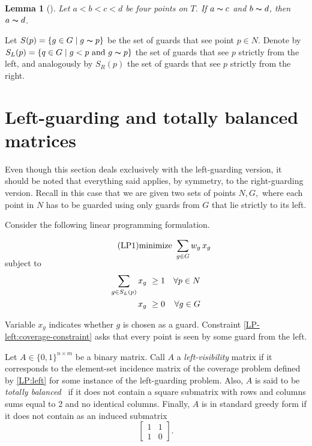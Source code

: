 \documentclass[11pt]{article}
\newcommand{\sees}{\thicksim}
\newtheorem{lemma}{Lemma}
\begin{document}
\begin{lemma}[\cite{journals/siamcomp/Ben-MosheKM07}] \label{lem:Mitchell}
  Let $a<b<c<d$ be four points on $T$. If $a\sees c$ and $b\sees d$,
  then $a\sees d$.
\end{lemma}

Let $S(p)=\{g\in G \mid g \sees p \}$ be the set of guards that
see point $p\in N$.  Denote by $S_L(p)=\{q\in G \mid g < p \textrm{
and } g\sees p \}$ the set of guards that see $p$ strictly from
the left, and analogously by $S_R(p)$ the set of guards that see $p$
strictly from the right.

\section{Left-guarding and totally balanced matrices}
\label{sec:left-guarding}

Even though this section deals exclusively with the left-guarding version, it
should be noted that everything said applies, by symmetry, to the
right-guarding version. Recall in this case that we are given two sets of points $N,G,$ where each point in $N$
has to be guarded using only guards from $G$ that lie strictly to its left.

Consider the following linear programming formulation.

\begin{gather} \label{LP:left} \tag{LP1}
  \text{minimize} \ \sum_{g\in G} w_g\, x_g \\[-6ex] \notag
\end{gather}
\hspace{1.5cm} subject to \\[-3ex]
\begin{align}
  \label{LP-left:coverage-constraint}
  \sum_{g\in S_L(p)} x_{g}\ & \ge 1 & \forall p\in N \\
  \notag
  x_g\ & \geq 0 & \forall g\in G
\end{align}

Variable $x_g$ indicates whether $g$ is chosen as a guard. Constraint
\eqref{LP-left:coverage-constraint} asks that every point is seen by some
guard from the left.

Let $A\in\{0,1\}^{n \times m}$ be a binary matrix. Call $A$ a
\emph{left-visibility} matrix if it corresponds to the element-set incidence
matrix of the coverage problem defined by \eqref{LP:left} for some instance of
the left-guarding problem. Also, $A$ is said to be \emph{totally
  balanced}~\cite{journal/mp/Berge72} if it does not contain a square
submatrix with rows and columns sums equal to 2 and no identical columns.
Finally, $A$ is in standard greedy form if it does not contain as an induced
submatrix
\begin{equation} \label{eq:forbidden}
  \left[\begin{array}{cc} 1 & 1 \\ 1 & 0 \end{array} \right].
\end{equation}
\end{document}
